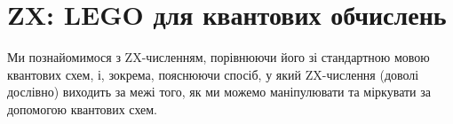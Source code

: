 \documentclass[11pt]{article}
\theoremstyle{definition}
\def\bR{\begin{color}{red}}
\def\e{\end{color}\xspace}
\newcommand{\TODOb}[1]{\marginpar{\scriptsize\bR \textbf{TODO:} #1\e}}
\begin{document}
%
% 
%


\section{ZX: LEGO для квантових обчислень}\label{sec:ZX}%

Ми познайомимося з ZX-численням, порівнюючи його зі стандартною мовою квантових схем, і, зокрема, пояснюючи спосіб, у який ZX-числення (доволі дослівно) виходить за межі того, як ми можемо маніпулювати та міркувати за допомогою квантових схем.
\end{document}
